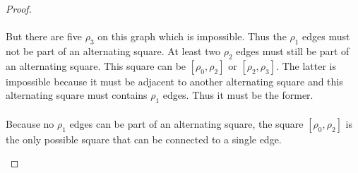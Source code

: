 \begin{proof}
  \paragraph{}
  But there are five $\rho_3$ on this graph which is impossible. Thus the $\rho_1$ edges must not be part of an alternating square. At least two $\rho_2$ edges must still be part of an alternating square. This square can be $[\rho_0, \rho_2]$ or $[\rho_2, \rho_3]$. The latter is impossible because it must be adjacent to another alternating square and this alternating square must contains $\rho_1$ edges. Thus it must be the former.

  \paragraph{}
  Because no $\rho_1$ edges can be part of an alternating square, the square $[\rho_0, \rho_2]$ is the only possible square that can be connected to a single edge.

  \begin{figure}[H]
    \begin{center}
      \caption{}
    \end{center}
  \end{figure}


\end{proof}

